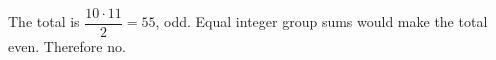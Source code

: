 The total is $\dfrac{10\cdot11}{2}=55$, odd. Equal integer group sums would make the total even. Therefore $\boxed{\text{no}}$.
